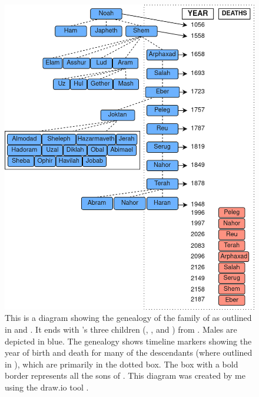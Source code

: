 \begin{figure}[htbp] %
	\centering
	\includegraphics[width=0.9\linewidth]{images/genealogies/shems_genealogy.png}
	\caption{This is a diagram showing the genealogy of the family of  as outlined in  and . It ends with 's three children (, , and ) from . Males are depicted in blue. The genealogy shows timeline markers showing the year of birth and death for many of the descendants (where outlined in ), which are primarily in the dotted box. The box with a bold border represents all the sons of . This diagram was created by me using the draw.io tool \cite{draw.io}.}
	\label{fig:shems_genealogy}
\end{figure}
